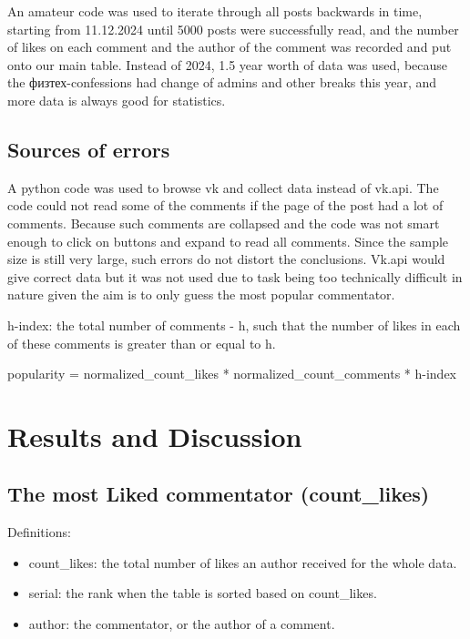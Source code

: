 \documentclass[
	11pt
] {article}
\begin{document}
		An amateur code \cite{code-scrape-py} was used to iterate through all posts backwards in time, starting from 11.12.2024 until 5000 posts were successfully read, and the number of likes on each comment and the author of the comment was recorded and put onto our main table. Instead of 2024, 1.5 year worth of data was used, because the физтех-confessions had change of admins and other breaks this year, and more data is always good for statistics.


	\subsection{Sources of errors}
		A python code was used to browse vk and collect data instead of vk.api. The code could not read some of the comments if the page of the post had a lot of comments. Because such comments are collapsed and the code was not smart enough to click on buttons and expand to read all comments. Since the sample size is still very large, such errors do not distort the conclusions. Vk.api would give correct data but it was not used due to task being too technically difficult in nature given the aim is to only guess the most popular commentator.



		h-index: the total number  of comments - h, such that the number of likes in each of these comments is greater than or equal to h.

		popularity = normalized\_count\_likes * normalized\_count\_comments * h-index


\section{Results and Discussion}
\subsection{The most Liked commentator (count\_likes)}
	Definitions:
	\begin{itemize}
		\item count\_likes: the total number of likes an author received for the whole data.
		\item serial: the rank when the table is sorted based on count\_likes.
		\item author: the commentator, or the author of a comment.
	\end{itemize}
\end{document}
